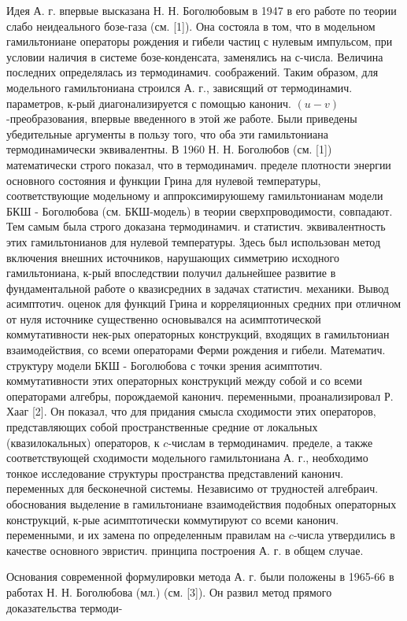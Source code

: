 \documentclass[10pt]{article}
\begin{document}
Идея А. г. впервые высказана Н. Н. Боголюбовым в 1947 в его работе по теории слабо неидеального бозе-газа (см. [1]). Она состояла в том, что в модельном гамильтониане операторы рождения и гибели частиц с нулевым импульсом, при условии наличия в системе бозе-конденсата, заменялись на с-числа. Величина последних определялась из термодинамич. соображений. Таким образом, для модельного гамильтониана строился А. г., зависящий от термодинамич. параметров, к-рый диагонализируется с помощью канонич. $(u-v)$-преобразования, впервые введенного в этой же работе. Были приведены убедительные аргументы в пользу того, что оба эти гамильтониана термодинамически эквивалентны. В 1960 Н. Н. Боголюбов (см. [1]) математически строго показал, что в термодинамич. пределе плотности энергии основного состояния и функции Грина для нулевой температуры, соответствующие модельному и аппроксимируюшему гамильтонианам модели БКШ - Боголюбова (см. БКШ-модель) в теории сверхпроводимости, совпадают. Тем самым была строго доказана термодинамич. и статистич. эквивалентность этих гамильтонианов для нулевой температуры. Здесь был использован метод включения внешних источников, нарушающих симметрию исходного гамильтониана, к-рый впоследствии получил дальнейшее развитие в фундаментальной работе о квазисредних в задачах статистич. механики. Вывод асимптотич. оценок для функций Грина и корреляционных средних при отличном от нуля источнике существенно основывался на асимптотической коммутативности нек-рых операторных конструкций, входящих в гамильтониан взаимодействия, со всеми операторами Ферми рождения и гибели. Математич. структуру модели БКШ - Боголюбова с точки зрения асимптотич. коммутативности этих операторных конструкций между собой и со всеми операторами алгебры, порождаемой канонич. переменными, проанализировал Р. Хааг [2]. Он показал, что для придания смысла сходимости этих операторов, представляющих собой пространственные средние от локальных (квазилокальных) операторов, к $c$-числам в термодинамич. пределе, а также соответствующей сходимости модельного гамильтониана А. г., необходимо тонкое исследование структуры пространства представлений канонич. переменных для бесконечной системы. Независимо от трудностей алгебраич. обоснования выделение в гамильтониане взаимодействия подобных операторных конструкций, к-рые асимптотически коммутируют со всеми канонич. переменными, и их замена по определенным правилам на $c$-числа утвердились в качестве основного эвристич. принципа построения А. г. в общем случае.



Основания современной формулировки метода А. г. были положены в 1965-66 в работах Н. Н. Боголюбова (мл.) (см. [3]). Он развил метод прямого доказательства термоди-
\end{document}
